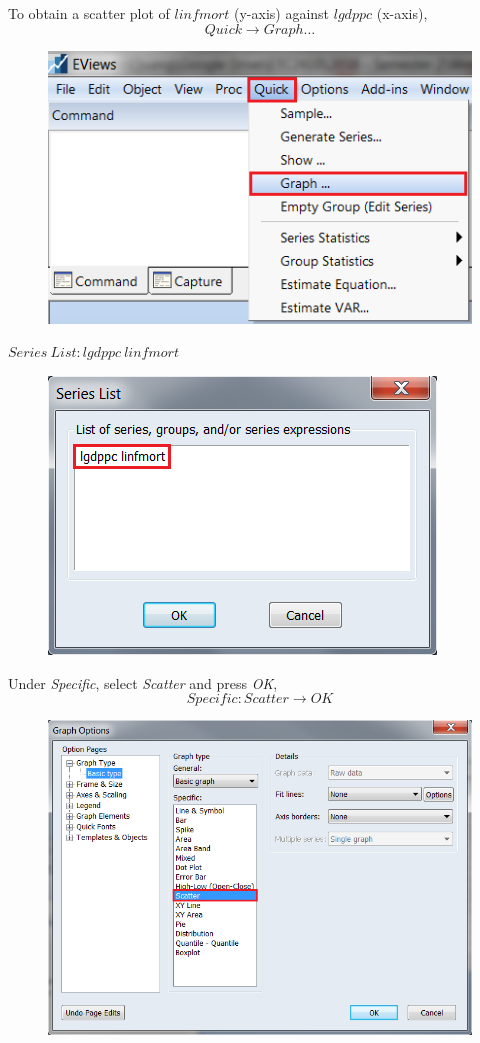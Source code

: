 \documentclass[12pt]{report}
\begin{document}
\newpage
\noindent To obtain a scatter plot of $linfmort$ (y-axis) against $lgdppc$ (x-axis),
$$Quick \to Graph \dots$$
\begin{figure}[H]
	\centerline{\includegraphics{2018sem2_q1_5}}
\end{figure}
\vspace{-\baselineskip} \center $Series\ List: lgdppc\ linfmort$
\begin{figure}[H]
	\centerline{\includegraphics{2018sem2_q13}}
\end{figure}
\vspace{-\baselineskip} \justify \noindent Under \textit{Specific}, select \textit{Scatter} and press \textit{OK},
$$Specific:Scatter \to OK$$
\begin{figure}[H]
	\centerline{\includegraphics{scat3}}
\end{figure}
\end{document}
